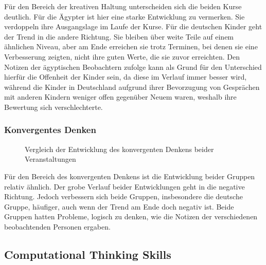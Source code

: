 Für den Bereich der kreativen Haltung unterscheiden sich die beiden Kurse deutlich. Für die Ägypter ist hier eine starke Entwicklung zu vermerken. Sie verdoppeln ihre Ausgangslage im Laufe der Kurse. Für die deutschen Kinder geht der Trend in die andere Richtung. Sie bleiben über weite Teile auf einem ähnlichen Niveau, aber am Ende erreichen sie trotz Terminen, bei denen sie eine Verbesserung zeigten, nicht ihre guten Werte, die sie zuvor erreichten. Den Notizen der ägyptischen Beobachtern zufolge kann als Grund für den Unterschied hierfür die Offenheit der Kinder sein, da diese im Verlauf immer besser wird, während die Kinder in Deutschland aufgrund ihrer Bevorzugung von Gesprächen mit anderen Kindern weniger offen gegenüber Neuem waren, weshalb ihre Bewertung sich verschlechterte. 

\subsubsection{Konvergentes Denken}
\begin{figure}[H]
	\centering
	\caption[Vergleich Entwicklung konvergentes Denken beider Veranstaltungen]{Vergleich der Entwicklung des konvergenten Denkens beider Veranstaltungen}
\end{figure}

Für den Bereich des konvergenten Denkens ist die Entwicklung beider Gruppen relativ ähnlich. Der grobe Verlauf beider Entwicklungen geht in die negative Richtung. Jedoch verbessern sich beide Gruppen, insbesondere die deutsche Gruppe, häufiger, auch wenn der Trend am Ende doch negativ ist. Beide Gruppen hatten Probleme, logisch zu denken, wie die Notizen der verschiedenen beobachtenden Personen ergaben.

\subsection{Computational Thinking Skills}
